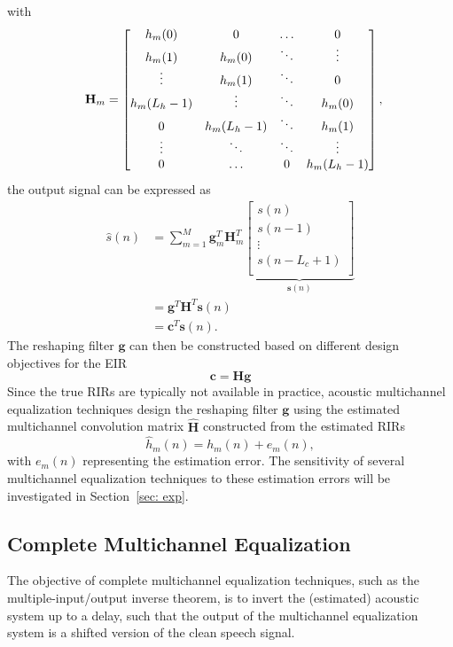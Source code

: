 \documentclass[draftcls,onecolumn,11pt]{IEEEtran}
\begin{document}
with
\begin{equation}
\hspace{-0.2cm}
\mathbf{H}_m =  \begin{bmatrix}
    h_m(0) & 0 &  \ldots & 0 \\
    h_m(1) & h_m(0) & \ddots & \vdots \\
    \vdots & h_m(1) & \ddots & 0 \\
    h_m(L_h-1) & \vdots & \ddots & h_m(0) \\
    0 & h_m(L_h-1) & \ddots & h_m(1) \\
    \vdots & \ddots & \ddots & \vdots \\
    0 & \ldots & 0 & h_m(L_h-1)
   \end{bmatrix},\hspace{-0.4cm}
 \end{equation}
the output signal can be expressed as
\begin{align}
\hat{s}(n) &=  \sum_{m=1}^{M} \mathbf{g}_m^T
 \mathbf{H}_m^T
\underbrace{\left[
\begin{array}{c}
s(n) \\
s(n-1) \\
\vdots \\
s(n-L_c+1) \\
\end{array}
\right]}_{\mathbf{s}(n)}  \\
& =  \mathbf{g}^T \mathbf{H}^T \mathbf{s}(n) \\
& =  \mathbf{c}^T \mathbf{s}(n).
\end{align}
The reshaping filter $\mathbf{g}$ can then be constructed based on different design objectives for the EIR
\begin{equation}
\boxed{\mathbf{c} = \mathbf{H}\mathbf{g}}
\end{equation}
Since the true RIRs are typically not available in practice, acoustic multichannel equalization techniques design the reshaping filter $\mathbf{g}$ using the estimated multichannel convolution matrix $\hat{\mathbf{H}}$ constructed from the estimated RIRs
\begin{equation}
\label{eq: hath}
\hat{h}_m(n) = h_m(n) + e_m(n),
\end{equation}
with $e_m(n)$ representing the estimation error.
The sensitivity of several multichannel equalization techniques to these estimation errors will be investigated in Section~\ref{sec: exp}.


\subsection{Complete Multichannel Equalization}
\label{subsec: mint}
The objective of complete multichannel equalization techniques, such as the multiple-input/output inverse theorem, is to invert the (estimated) acoustic system up to a delay, such that the output of the multichannel equalization system is a shifted version of the clean speech signal.
\end{document}

